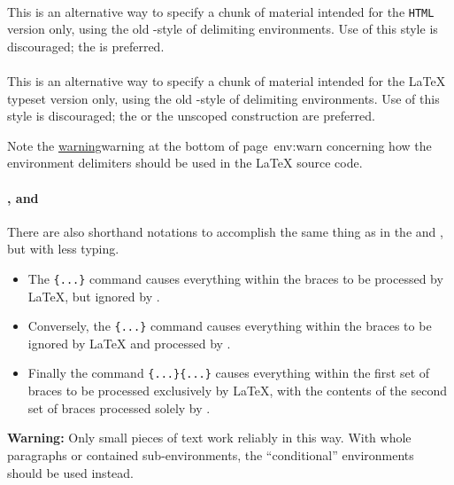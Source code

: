 \paragraph*{\label{endhtmlonly}}
\begin{changebar}
This is an alternative way to specify a chunk of material intended
for the \texttt{HTML} version only,
using the old \AmS-style of delimiting environments.
Use of this style is discouraged; 
the   is preferred.%
\end{changebar}%


%
\paragraph*{\label{endlatexonly}}
\begin{changebar}
This is an alternative way to specify a chunk of material intended
for the \LaTeX{} typeset version only,
using the old \AmS-style of delimiting environments.
Use of this style is discouraged; 
the   or the unscoped 
construction are preferred.%
\end{changebar}%

\smallskip\noindent
Note the \hyperref[page]{warning}{warning at the bottom of page~}{}{env:warn}
concerning how the environment delimiters should be used in the
\LaTeX{} source code.


%
%
%
\html{\\}%
\paragraph*{,  and \label{latexhtml}}
\begin{changebar}
There are also shorthand notations to accomplish the same thing 
as in the   and  
, but with less typing.
\begin{itemize}
\item 
The \verb|{...}| command causes everything within the braces 
to be processed by \LaTeX, but ignored by \latextohtml.
\item  
Conversely, the \verb|{...}| command causes everything within the braces 
to be ignored by \LaTeX{} and processed by \latextohtml.  
\item  
Finally the command \verb|{...}{...}| causes everything 
within the first set of braces to be processed exclusively by \LaTeX, 
with the contents of the second set of braces processed solely by \latextohtml.%
\end{itemize}
\textbf{Warning: }
Only small pieces of text work reliably in this way. 
With whole paragraphs or contained sub-environments,
the ``conditional'' environments should be used instead.
\end{changebar}

